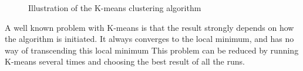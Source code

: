 \begin{figure}[t!]
	\centering
		\qquad
		\qquad


		\qquad
		\qquad	
		\caption{Illustration of the K-means clustering algorithm}%
		\label{fig:mincutresults}%
\end{figure}


A well known problem with K-means is that the result strongly depends on how the algorithm is initiated. It always converges to the local minimum, and has no way of transcending this local minimum
This problem can be reduced by running K-means several times and choosing the best result of all the runs. 



